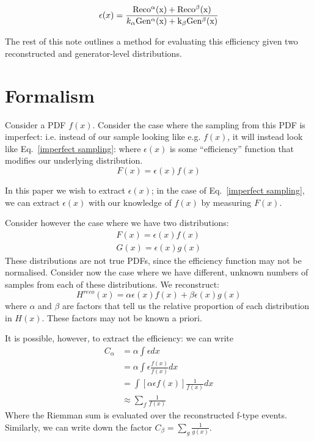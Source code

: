 \documentclass{article}
\begin{document}
\begin{equation}
    \epsilon(x) = \frac{\rm{Reco^{\alpha}(x) + Reco^{\beta}(x)}}{k_{\alpha}\rm{Gen^{\alpha}(x)} + k_{\beta}\rm{Gen^{\beta}(x)}}
    \label{combined}
\end{equation}

The rest of this note outlines a method for evaluating this efficiency given two reconstructed and generator-level distributions.

\section{Formalism}
Consider a PDF $f(x)$.
Consider the case where the sampling from this PDF is imperfect: i.e. instead of our sample looking like e.g. $f(x)$, it will instead
look like Eq.~\ref{imperfect sampling}:
where $\epsilon(x)$ is some ``efficiency'' function that modifies our underlying distribution.
\begin{equation}
    F(x) = \epsilon(x)f(x)
    \label{imperfect sampling}
\end{equation}

In this paper we wish to extract $\epsilon(x)$; in the case of Eq.~\ref{imperfect sampling}, we can extract $\epsilon(x)$ with our knowledge of $f(x)$ by measuring $F(x)$.

Consider however the case where we have two distributions:
\begin{equation}
    \begin{split}
        F(x) = \epsilon(x)f(x)\\
        G(x) = \epsilon(x)g(x)
    \end{split}
    \label{two_efficiencies}
\end{equation}
These distributions are not true PDFs, since the efficiency function may not be normalised.
Consider now the case where we have different, unknown numbers of samples from each of these distributions.
We reconstruct:
\begin{equation}
    H^{reco}(x) = \alpha\epsilon(x)f(x) + \beta\epsilon(x)g(x)
    \label{combined_pdf}
\end{equation}
where $\alpha$ and $\beta$ are factors that tell us the relative proportion of each distribution in $H(x)$.
These factors may not be known a priori.

It is possible, however, to extract the efficiency: we can write
\begin{equation}
    \begin{aligned}
        C_\alpha & = \alpha\int\epsilon dx                                \\
                 & = \alpha\int\epsilon\frac{f(x)}{f(x)}dx                \\
                 & = \int\left[\alpha\epsilon f(x)\right]\frac{1}{f(x)}dx \\
                 & \approx \sum_{f}\frac{1}{f(x)}
    \end{aligned}
    \label{correction_factor}
\end{equation}
Where the Riemman sum is evaluated over the reconstructed f-type events.
Similarly, we can write down the factor $C_\beta = \sum_g\frac{1}{g(x)}$.
\end{document}
